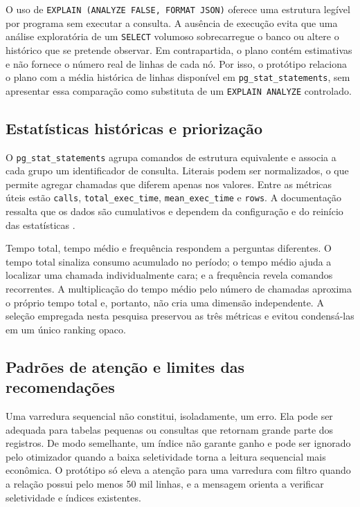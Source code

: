 \documentclass{UNESC}
\newcommand{\codigo}[1]{\texttt{#1}}
\begin{document}
O uso de \codigo{EXPLAIN (ANALYZE FALSE, FORMAT JSON)} oferece uma estrutura legível por programa sem executar a consulta. A ausência de execução evita que uma análise exploratória de um \codigo{SELECT} volumoso sobrecarregue o banco ou altere o histórico que se pretende observar. Em contrapartida, o plano contém estimativas e não fornece o número real de linhas de cada nó. Por isso, o protótipo relaciona o plano com a média histórica de linhas disponível em \codigo{pg\_stat\_statements}, sem apresentar essa comparação como substituta de um \codigo{EXPLAIN ANALYZE} controlado.

\subsection{Estatísticas históricas e priorização}

O \codigo{pg\_stat\_statements} agrupa comandos de estrutura equivalente e associa a cada grupo um identificador de consulta. Literais podem ser normalizados, o que permite agregar chamadas que diferem apenas nos valores. Entre as métricas úteis estão \codigo{calls}, \codigo{total\_exec\_time}, \codigo{mean\_exec\_time} e \codigo{rows}. A documentação ressalta que os dados são cumulativos e dependem da configuração e do reinício das estatísticas \cite{postgresql2026pgstat}.

Tempo total, tempo médio e frequência respondem a perguntas diferentes. O tempo total sinaliza consumo acumulado no período; o tempo médio ajuda a localizar uma chamada individualmente cara; e a frequência revela comandos recorrentes. A multiplicação do tempo médio pelo número de chamadas aproxima o próprio tempo total e, portanto, não cria uma dimensão independente. A seleção empregada nesta pesquisa preservou as três métricas e evitou condensá-las em um único ranking opaco.

\subsection{Padrões de atenção e limites das recomendações}

Uma varredura sequencial não constitui, isoladamente, um erro. Ela pode ser adequada para tabelas pequenas ou consultas que retornam grande parte dos registros. De modo semelhante, um índice não garante ganho e pode ser ignorado pelo otimizador quando a baixa seletividade torna a leitura sequencial mais econômica. O protótipo só eleva a atenção para uma varredura com filtro quando a relação possui pelo menos 50 mil linhas, e a mensagem orienta a verificar seletividade e índices existentes.
\end{document}
